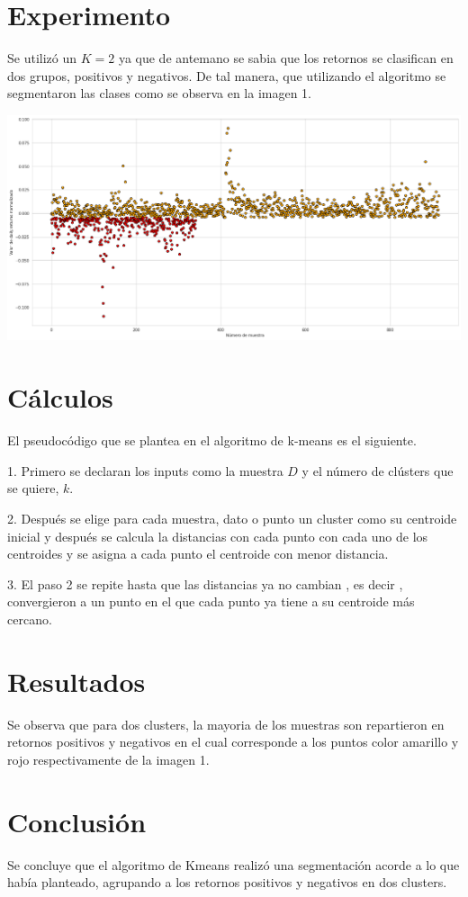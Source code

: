 \documentclass[a4paper]{article}
\begin{document}
\section{Experimento}
Se utiliz\'o un $ K =2$ ya que de antemano se sabia que los retornos se clasifican en dos grupos, positivos y negativos.  De tal manera, que utilizando el algoritmo se segmentaron las clases como se observa en la imagen 1.

\includegraphics[scale=0.2]{segmentacion.png}

\section{C\'alculos}

El pseudoc\'odigo que se plantea en el algoritmo de k-means es el siguiente.

1. Primero se declaran los inputs como la muestra $D$ y el número de cl\'usters que se quiere, $k$.

2. Despu\'es se elige para cada muestra, dato o punto un cluster como su centroide inicial y despu\'es se calcula la distancias con cada punto con cada uno de los centroides y se asigna a cada punto el centroide con menor distancia. 

3. El paso 2 se repite hasta que las distancias ya no cambian , es decir , convergieron a un punto en el que cada punto ya tiene a su centroide m\'as cercano. 


\section{Resultados}

 Se observa que para dos clusters, la mayoria de los muestras son repartieron en retornos positivos y negativos en el cual corresponde a los puntos color amarillo y rojo respectivamente de la imagen 1. 

\section{Conclusi\'on}

Se concluye que el algoritmo de Kmeans realiz\'o una segmentaci\'on acorde a lo que hab\'ia planteado, agrupando a los retornos positivos y negativos en dos clusters.
\end{document}
